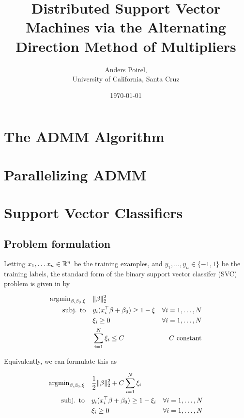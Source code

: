 \documentclass[11pt]{article}
\author{Anders Poirel, \\ University of California, Santa Cruz}
\date{\today}
\title{
    Distributed Support Vector Machines via the Alternating Direction Method of Multipliers
}
\begin{document}
\maketitle 

\section{The ADMM Algorithm}

\section{Parallelizing ADMM}

\section{Support Vector Classifiers}


\subsection{Problem formulation}

Letting $x_1, \ldots x_n \in \mathbb{R}^n$ be the training examples, and $y_1, \ldots, y_n \in \{-1,1\}$ be the training labels, 
the standard form of the binary support vector classifer (SVC) problem is given in   \cite{hastie2009elements} by

\begin{equation} \label{first_form}
\begin{aligned}
    \operatorname{argmin}_{\beta, \beta_0, \xi}  \quad 
    & \|\beta\|^2_2 & \\
    \textrm{subj. to} \quad 
    & y_i (x_i^\top \beta + \beta_0) \geq 1 - \xi & \forall i = 1, \ldots, N \\
    & \xi_i \geq 0  & \forall i = 1, \ldots, N \\
    & \sum_{i=1}^N \xi_i \leq C & C \textrm{ constant}
\end{aligned}
\end{equation}

Equivalently, we can formulate this as 

\begin{equation} \label{second_form}
\begin{aligned}
    \operatorname{argmin}_{\beta, \beta_0, \xi} \quad 
    & \frac{1}{2} \| \beta  \|_2^2 +  C \sum_{i=1}^N \xi_i & \\ 
    \textrm{subj. to}  \quad 
    & y_i (x_i^\top \beta + \beta_0) \geq 1 - \xi_i & \forall i = 1, \ldots, N \\
    & \xi_i \geq 0  & \forall i = 1, \ldots, N 
\end{aligned}
\end{equation}
\end{document}
